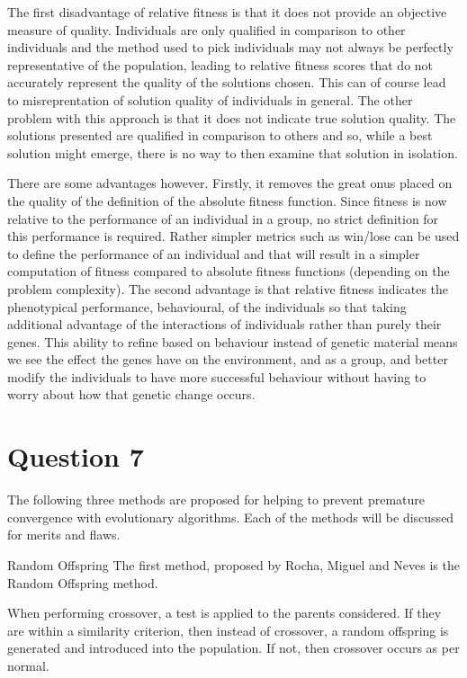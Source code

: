 \documentclass[12pt]{article}
\begin{document}
The first disadvantage of relative fitness is that it does not provide an objective measure of quality. Individuals are only qualified in comparison to other individuals and the method used to pick individuals may not always be perfectly representative of the population, leading to relative fitness scores that do not accurately represent the quality of the solutions chosen. This can of course lead to misreprentation of solution quality of individuals in general. The other problem with this approach is that it does not indicate true solution quality. The solutions presented are qualified in comparison to others and so, while a best solution might emerge, there is no way to then examine that solution in isolation. 

There are some advantages however. Firstly, it removes the great onus placed on the quality of the definition of the absolute fitness function. Since fitness is now relative to the performance of an individual in a group, no strict definition for this performance is required. Rather simpler metrics such as win/lose can be used to define the performance of an individual and that will result in a simpler computation of fitness compared to absolute fitness functions (depending on the problem complexity). The second advantage is that relative fitness indicates the phenotypical performance, behavioural, of the individuals so that taking additional advantage of the interactions of individuals rather than purely their genes. This ability to refine based on behaviour instead of genetic material means we see the effect the genes have on the environment, and as a group, and better modify the individuals to have more successful behaviour without having to worry about how that genetic change occurs.
\section{Question 7}
The following three methods are proposed for helping to prevent premature convergence with evolutionary algorithms. Each of the methods will be discussed for merits and flaws.


Random Offspring
The first method, proposed by Rocha, Miguel and Neves \cite{Rocha1999} is the Random Offspring method. 

When performing crossover, a test is applied to the parents considered. If they are within a similarity criterion, then instead of crossover, a random offspring is generated and introduced into the population. If not, then crossover occurs as per normal. 
\end{document}
